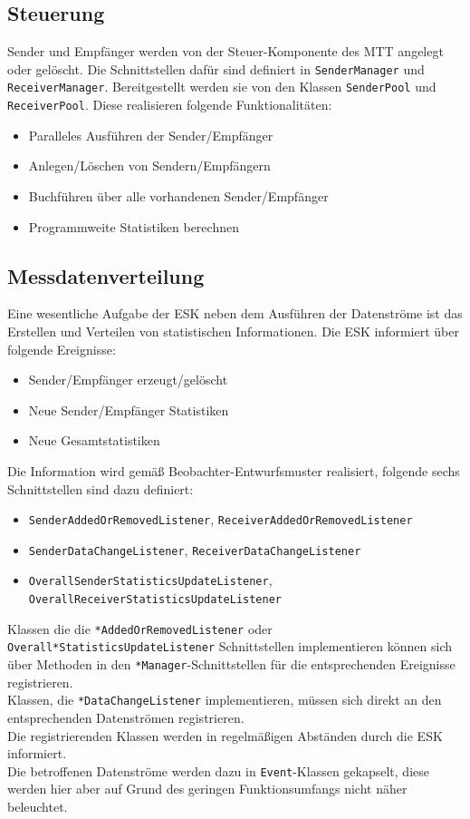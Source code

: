 \subsection{Steuerung}
Sender und Empfänger werden von der Steuer-Komponente des MTT
angelegt oder gelöscht. Die Schnittstellen dafür sind definiert in
\texttt{SenderManager} und \texttt{ReceiverManager}. Bereitgestellt werden sie von den Klassen
\texttt{SenderPool} und \texttt{ReceiverPool}. Diese realisieren folgende
Funktionalitäten:
\begin{itemize}
  \item Paralleles Ausführen der Sender/Empfänger
  \item Anlegen/Löschen von Sendern/Empfängern
  \item Buchführen über alle vorhandenen Sender/Empfänger
  \item Programmweite Statistiken berechnen
\end{itemize}

\subsection{Messdatenverteilung}
Eine wesentliche Aufgabe der ESK neben dem Ausführen der Datenströme ist das
Erstellen und Verteilen von statistischen Informationen. Die ESK informiert über
folgende Ereignisse:
\begin{itemize}
  \item Sender/Empfänger erzeugt/gelöscht
  \item Neue Sender/Empfänger Statistiken
  \item Neue Gesamtstatistiken
\end{itemize}

Die Information wird gemäß
Beobachter-Entwurfsmuster realisiert, folgende sechs Schnittstellen sind dazu
definiert:

\begin{itemize}
  \item
  \texttt{SenderAddedOrRemovedListener}, \texttt{ReceiverAddedOrRemovedListener}
  \item \texttt{SenderDataChangeListener}, \texttt{ReceiverDataChangeListener}
  \item \texttt{OverallSenderStatisticsUpdateListener},
  \texttt{OverallReceiverStatisticsUpdateListener}
\end{itemize}

Klassen die die \texttt{*AddedOrRemovedListener} oder
\texttt{Overall*StatisticsUpdateListener} Schnittstellen implementieren können
sich über Methoden in den \texttt{*Manager}-Schnittstellen für die
entsprechenden Ereignisse registrieren.\\
Klassen, die \texttt{*DataChangeListener} implementieren, müssen sich direkt an
den entsprechenden Datenströmen registrieren.\\
Die registrierenden Klassen werden in regelmäßigen
Abständen durch die ESK informiert.\\
Die betroffenen Datenströme werden dazu in \texttt{Event}-Klassen gekapselt,
diese werden hier aber auf Grund des geringen Funktionsumfangs nicht näher
beleuchtet.


